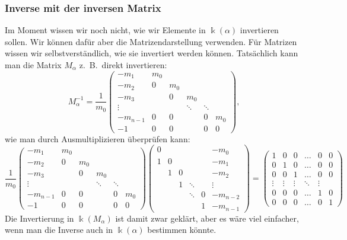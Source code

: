 \subsubsection{Inverse mit der inversen Matrix}
Im Moment wissen wir noch nicht, wie wir Elemente in $\Bbbk(\alpha)$ 
invertieren sollen.
Wir können dafür aber die Matrizendarstellung verwenden.
Für Matrizen wissen wir selbstverständlich, wie sie invertiert
werden können.
Tatsächlich kann man die Matrix $M_\alpha$ z.~B.~direkt invertieren:
\[
M_\alpha^{-1}
=
\frac{1}{m_0}
\begin{pmatrix}
   -m_1 &m_0&   &      &      &   \\
   -m_2 & 0 &m_0&      &      &   \\
   -m_3 &   & 0 &   m_0&      &   \\
 \vdots &   &   &\ddots&\ddots&   \\
-m_{n-1}& 0 & 0 &      &  0   &m_0\\
    -1  & 0 & 0 &      &  0   & 0
\end{pmatrix},
\]
wie man durch Ausmultiplizieren überprüfen kann:
\[
\frac{1}{m_0}
\begin{pmatrix}
   -m_1 &m_0&   &      &      &   \\
   -m_2 & 0 &m_0&      &      &   \\
   -m_3 &   & 0 &   m_0&      &   \\
 \vdots &   &   &\ddots&\ddots&   \\
-m_{n-1}& 0 & 0 &      &  0   &m_0\\
    -1  & 0 & 0 &      &  0   & 0
\end{pmatrix}
\begin{pmatrix}
  0   &    &    &      &   &-m_0    \\
  1   & 0  &    &      &   &-m_1    \\
      & 1  & 0  &      &   &-m_2    \\
      &    & 1  &\ddots&   &\vdots  \\
      &    &    &\ddots& 0 &-m_{n-2}\\
      &    &    &      & 1 &-m_{n-1}
\end{pmatrix}
=
\begin{pmatrix}
1&0&0&\dots&0&0\\
0&1&0&\dots&0&0\\
0&0&1&\dots&0&0\\
\vdots&\vdots&\vdots&\ddots&\vdots\\
0&0&0&\dots&1&0\\
0&0&0&\dots&0&1
\end{pmatrix}
\]
Die Invertierung in $\Bbbk(M_\alpha)$ ist damit zwar geklärt, aber
es wäre viel einfacher, wenn man die Inverse auch in $\Bbbk(\alpha)$
bestimmen könnte.

